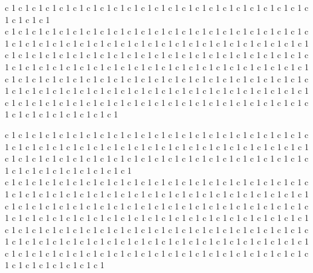 \documentclass[11pt]{article}
\begin{document}
  c 1    c 1    c 1    c 1    c 1    c 1    c 1    c 1    c 1    c 1    c 1    c 1    c 1    c 1    c 1    c 1    c 1    c 1    c 1    c 1    c 1    c 1    c 1    c 1    c 1    c 1  \\   c 1    c 1    c 1    c 1    c 1    c 1    c 1    c 1    c 1    c 1    c 1    c 1    c 1    c 1    c 1    c 1    c 1    c 1    c 1    c 1    c 1    c 1    c 1    c 1    c 1    c 1    c 1    c 1    c 1    c 1    c 1    c 1    c 1    c 1    c 1    c 1    c 1    c 1    c 1    c 1    c 1    c 1    c 1    c 1    c 1    c 1    c 1    c 1    c 1    c 1    c 1    c 1    c 1    c 1    c 1    c 1    c 1    c 1    c 1    c 1    c 1    c 1 
  c 1    c 1    c 1    c 1    c 1    c 1    c 1    c 1    c 1    c 1    c 1    c 1    c 1    c 1    c 1    c 1    c 1    c 1    c 1    c 1    c 1    c 1    c 1    c 1    c 1    c 1    c 1    c 1    c 1    c 1    c 1    c 1    c 1    c 1    c 1    c 1    c 1    c 1    c 1    c 1    c 1    c 1    c 1    c 1    c 1    c 1    c 1    c 1    c 1    c 1    c 1    c 1    c 1    c 1    c 1    c 1    c 1    c 1 
  c 1    c 1    c 1    c 1    c 1    c 1    c 1    c 1    c 1    c 1    c 1    c 1    c 1    c 1    c 1    c 1    c 1    c 1    c 1    c 1    c 1    c 1    c 1    c 1    c 1    c 1    c 1    c 1    c 1    c 1    c 1    c 1    c 1    c 1    c 1    c 1    c 1    c 1    c 1    c 1    c 1    c 1    c 1    c 1    c 1    c 1 


  c 1    c 1    c 1    c 1    c 1    c 1    c 1    c 1    c 1    c 1    c 1    c 1    c 1    c 1    c 1    c 1    c 1    c 1    c 1    c 1    c 1    c 1    c 1    c 1    c 1    c 1    c 1    c 1    c 1    c 1    c 1    c 1    c 1    c 1    c 1    c 1    c 1    c 1    c 1    c 1    c 1    c 1    c 1    c 1    c 1    c 1    c 1    c 1    c 1    c 1    c 1    c 1    c 1    c 1    c 1    c 1    c 1    c 1 
  c 1    c 1    c 1    c 1    c 1    c 1    c 1    c 1    c 1    c 1    c 1    c 1    c 1    c 1    c 1    c 1    c 1    c 1    c 1  \\   c 1    c 1    c 1    c 1    c 1    c 1    c 1    c 1    c 1    c 1    c 1    c 1    c 1    c 1    c 1    c 1    c 1    c 1    c 1    c 1    c 1    c 1    c 1    c 1    c 1    c 1    c 1    c 1    c 1    c 1    c 1    c 1    c 1    c 1    c 1    c 1    c 1    c 1    c 1    c 1    c 1    c 1    c 1    c 1    c 1    c 1    c 1    c 1    c 1    c 1    c 1    c 1    c 1    c 1    c 1    c 1    c 1    c 1    c 1    c 1    c 1    c 1    c 1    c 1    c 1    c 1    c 1    c 1    c 1    c 1    c 1    c 1    c 1    c 1    c 1    c 1    c 1    c 1    c 1    c 1    c 1    c 1    c 1    c 1    c 1    c 1    c 1    c 1    c 1    c 1    c 1    c 1    c 1    c 1    c 1    c 1    c 1    c 1    c 1    c 1    c 1    c 1    c 1    c 1    c 1    c 1    c 1    c 1    c 1    c 1    c 1 
  c 1    c 1    c 1    c 1    c 1    c 1    c 1    c 1    c 1    c 1    c 1    c 1    c 1    c 1    c 1    c 1    c 1    c 1    c 1    c 1    c 1    c 1    c 1    c 1    c 1    c 1    c 1    c 1    c 1    c 1    c 1    c 1    c 1    c 1    c 1    c 1    c 1    c 1    c 1    c 1    c 1    c 1    c 1    c 1    c 1    c 1    c 1    c 1    c 1    c 1    c 1    c 1    c 1    c 1 
\end{document}
